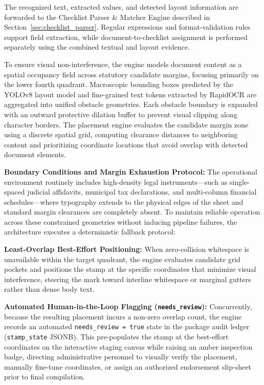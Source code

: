 The recognized text, extracted values, and detected layout information are forwarded to the Checklist Parser \& Matcher Engine described in Section~\ref{sec:checklist_parser}. Regular expressions and format-validation rules support field extraction, while document-to-checklist assignment is performed separately using the combined textual and layout evidence.

To ensure visual non-interference, the engine models document content as a spatial occupancy field across statutory candidate margins, focusing primarily on the lower fourth quadrant. Macroscopic bounding boxes predicted by the YOLOv8 layout model and fine-grained text tokens extracted by RapidOCR are aggregated into unified obstacle geometries. Each obstacle boundary is expanded with an outward protective dilation buffer to prevent visual clipping along character borders. The placement engine evaluates the candidate margin zone using a discrete spatial grid, computing clearance distances to neighboring content and prioritizing coordinate locations that avoid overlap with detected document elements.

\textbf{Boundary Conditions and Margin Exhaustion Protocol:} The operational environment routinely includes high-density legal instruments---such as single-spaced judicial affidavits, municipal tax declarations, and multi-column financial schedules---where typography extends to the physical edges of the sheet and standard margin clearances are completely absent. To maintain reliable operation across these constrained geometries without inducing pipeline failures, the architecture executes a deterministic fallback protocol:

\textbf{Least-Overlap Best-Effort Positioning:} When zero-collision whitespace is unavailable within the target quadrant, the engine evaluates candidate grid pockets and positions the stamp at the specific coordinates that minimize visual interference, steering the mark toward interline whitespace or marginal gutters rather than dense body text.

\textbf{Automated Human-in-the-Loop Flagging (\texttt{needs\_review}):} Concurrently, because the resulting placement incurs a non-zero overlap count, the engine records an automated \texttt{needs\_review = true} state in the package audit ledger (\texttt{stamp\_state} JSONB). This pre-populates the stamp at the best-effort coordinates on the interactive staging canvas while raising an amber inspection badge, directing administrative personnel to visually verify the placement, manually fine-tune coordinates, or assign an authorized endorsement slip-sheet prior to final compilation.

